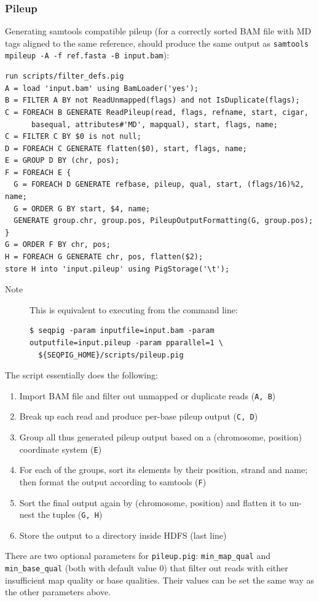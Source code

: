 \subsubsection{Pileup}
\label{subsubsect:pileup}
Generating samtools compatible pileup (for a correctly sorted BAM file
with MD tags aligned to the same reference, should produce the same output as
{\tt samtools mpileup -A -f ref.fasta -B input.bam}):
\begin{lstlisting}
run scripts/filter_defs.pig
A = load 'input.bam' using BamLoader('yes');
B = FILTER A BY not ReadUnmapped(flags) and not IsDuplicate(flags);
C = FOREACH B GENERATE ReadPileup(read, flags, refname, start, cigar,
      basequal, attributes#'MD', mapqual), start, flags, name;
C = FILTER C BY $0 is not null;
D = FOREACH C GENERATE flatten($0), start, flags, name;
E = GROUP D BY (chr, pos);
F = FOREACH E {
  G = FOREACH D GENERATE refbase, pileup, qual, start, (flags/16)%2, name;
  G = ORDER G BY start, $4, name;
  GENERATE group.chr, group.pos, PileupOutputFormatting(G, group.pos);
}
G = ORDER F BY chr, pos;
H = FOREACH G GENERATE chr, pos, flatten($2);
store H into 'input.pileup' using PigStorage('\t');
\end{lstlisting}
\begin{description}
	\item[Note] This is equivalent to executing from the command line:
\begin{lstlisting}
$ seqpig -param inputfile=input.bam -param outputfile=input.pileup -param pparallel=1 \
  ${SEQPIG_HOME}/scripts/pileup.pig
\end{lstlisting}
\end{description}
The script essentially does the following:
\begin{enumerate}
\item Import BAM file and filter out unmapped or duplicate reads ({\tt A, B})
\item Break up each read and produce per-base pileup output ({\tt C, D})
\item Group all thus generated pileup output based on a (chromosome, position)
coordinate system ({\tt E})
\item For each of the groups, sort its elements by their position, strand and name;
then format the output according to samtools ({\tt F})
\item Sort the final output again by (chromosome, position) and flatten
it to un-nest the tuples ({\tt G, H})
\item Store the output to a directory inside HDFS (last line)
\end{enumerate}
There are two optional parameters for {\tt pileup.pig}: {\tt min\_map\_qual} and
{\tt min\_base\_qual} (both with default value 0) that filter out reads with
either insufficient map quality or base qualities. Their values can
be set the same way as the other parameters above.


